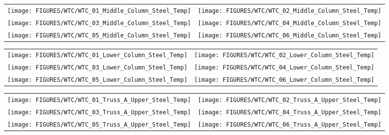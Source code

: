 \begin{figure}[p]
\begin{tabular*}{\textwidth}{l@{\extracolsep{\fill}}r}
\texttt{[image: FIGURES/WTC/WTC\_01\_Middle\_Column\_Steel\_Temp]} &
\texttt{[image: FIGURES/WTC/WTC\_02\_Middle\_Column\_Steel\_Temp]} \\
\texttt{[image: FIGURES/WTC/WTC\_03\_Middle\_Column\_Steel\_Temp]} &
\texttt{[image: FIGURES/WTC/WTC\_04\_Middle\_Column\_Steel\_Temp]} \\
\texttt{[image: FIGURES/WTC/WTC\_05\_Middle\_Column\_Steel\_Temp]} &
\texttt{[image: FIGURES/WTC/WTC\_06\_Middle\_Column\_Steel\_Temp]}
\end{tabular*}
\label{NIST_WTC_Middle_Column_Steel}
\end{figure}

\begin{figure}[p]
\begin{tabular*}{\textwidth}{l@{\extracolsep{\fill}}r}
\texttt{[image: FIGURES/WTC/WTC\_01\_Lower\_Column\_Steel\_Temp]} &
\texttt{[image: FIGURES/WTC/WTC\_02\_Lower\_Column\_Steel\_Temp]} \\
\texttt{[image: FIGURES/WTC/WTC\_03\_Lower\_Column\_Steel\_Temp]} &
\texttt{[image: FIGURES/WTC/WTC\_04\_Lower\_Column\_Steel\_Temp]} \\
\texttt{[image: FIGURES/WTC/WTC\_05\_Lower\_Column\_Steel\_Temp]} &
\texttt{[image: FIGURES/WTC/WTC\_06\_Lower\_Column\_Steel\_Temp]}
\end{tabular*}
\label{NIST_WTC_Lower_Column_Steel}
\end{figure}

\begin{figure}[p]
\begin{tabular*}{\textwidth}{l@{\extracolsep{\fill}}r}
\texttt{[image: FIGURES/WTC/WTC\_01\_Truss\_A\_Upper\_Steel\_Temp]} &
\texttt{[image: FIGURES/WTC/WTC\_02\_Truss\_A\_Upper\_Steel\_Temp]} \\
\texttt{[image: FIGURES/WTC/WTC\_03\_Truss\_A\_Upper\_Steel\_Temp]} &
\texttt{[image: FIGURES/WTC/WTC\_04\_Truss\_A\_Upper\_Steel\_Temp]} \\
\texttt{[image: FIGURES/WTC/WTC\_05\_Truss\_A\_Upper\_Steel\_Temp]} &
\texttt{[image: FIGURES/WTC/WTC\_06\_Truss\_A\_Upper\_Steel\_Temp]}
\end{tabular*}
\label{NIST_WTC_Truss_A_Upper_Steel_Temp}
\end{figure}

